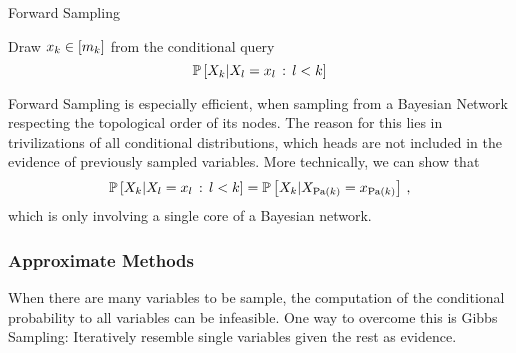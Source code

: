 \begin{algorithm}[hbt!]
\caption{Forward Sampling}\label{alg:ForwardSampling}
\begin{algorithmic}
\For{$\catenumeratorin$}
	\State Draw $x_{k}\in[m_{k}]$ from the conditional query
		\[ \mathbb{P}\left[X_{k}|X_{l}=x_{l} \, : \, l < k\right] \]
\EndFor
\end{algorithmic}
\end{algorithm}

%
Forward Sampling is especially efficient, when sampling from a Bayesian Network respecting the topological order of its nodes.
The reason for this lies in trivilizations of all conditional distributions, which heads are not included in the evidence of previously sampled variables.
More technically, we can show that
	\[ \mathbb{P}\left[X_{k}|X_{l}=x_{l} \, : \, l < k\right]  
	= \mathbb{P}\left[X_{k}|X_{\mathrm{Pa}(k)}=x_{\mathrm{Pa}(k)}\right] \, , \]
which is only involving a single core of a Bayesian network.



\subsubsection{Approximate Methods}

When there are many variables to be sample, the computation of the conditional probability to all variables can be infeasible.
One way to overcome this is Gibbs Sampling: Iteratively resemble single variables given the rest as evidence.


